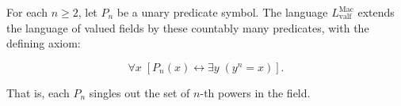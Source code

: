 For each $n \geq 2$, let $P_n$ be a unary predicate symbol. The language $L_{\text{valf}}^{\text{Mac}}$ extends the language of valued fields by these countably many predicates, with the defining axiom:

$$\forall x \; [P_n(x) \leftrightarrow \exists y \; (y^n = x)].$$

That is, each $P_n$ singles out the set of $n$-th powers in the field.
